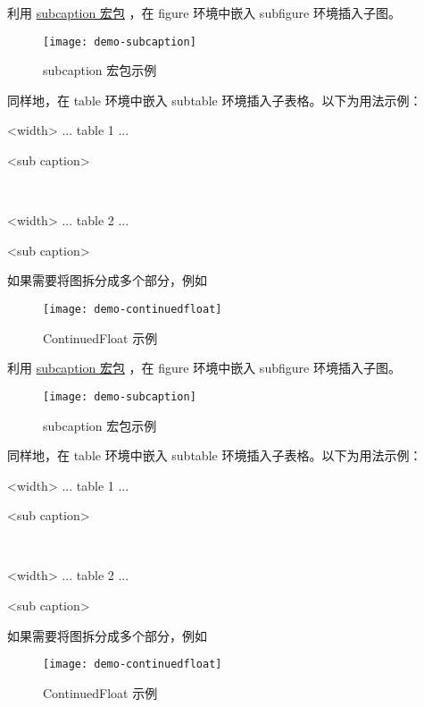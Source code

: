 利用 \href{http://www.ctan.org/pkg/subcaption}{subcaption 宏包} \cite{subcaption}，在 figure 环境中嵌入 subfigure 环境插入子图。
\begin{figure}[]
  \centering
  \texttt{[image: demo-subcaption]}
  \caption{subcaption 宏包示例}
  \label{demo-subcaption}
\end{figure}
同样地，在 table 环境中嵌入 subtable 环境插入子表格。以下为用法示例：
\begin{texlst}
\begin{table}[<placement specifier>]
  \begin{subtable}{<width>}
      \centering
      ... table 1 ...
  \caption{<sub caption>}
  \end{subtable}
  ~
  \begin{subtable}{<width>}
      \centering
      ... table 2 ...
      \caption{<sub caption>}
  \end{subtable}
\end{table}
\end{texlst}

如果需要将图拆分成多个部分，例如
\begin{figure}[]
  \centering
  \texttt{[image: demo-continuedfloat]}
  \caption{ContinuedFloat 示例}
  \label{demo-continuedfloat}
\end{figure}利用 \href{http://www.ctan.org/pkg/subcaption}{subcaption 宏包} \cite{subcaption}，在 figure 环境中嵌入 subfigure 环境插入子图。
\begin{figure}[]
  \centering
  \texttt{[image: demo-subcaption]}
  \caption{subcaption 宏包示例}
  \label{demo-subcaption}
\end{figure}
同样地，在 table 环境中嵌入 subtable 环境插入子表格。以下为用法示例：
\begin{texlst}
\begin{table}[<placement specifier>]
  \begin{subtable}{<width>}
      \centering
      ... table 1 ...
  \caption{<sub caption>}
  \end{subtable}
  ~
  \begin{subtable}{<width>}
      \centering
      ... table 2 ...
      \caption{<sub caption>}
  \end{subtable}
\end{table}
\end{texlst}

如果需要将图拆分成多个部分，例如
\begin{figure}[]
  \centering
  \texttt{[image: demo-continuedfloat]}
  \caption{ContinuedFloat 示例}
  \label{demo-continuedfloat}
\end{figure}